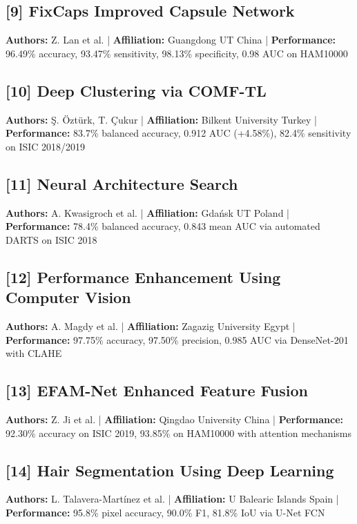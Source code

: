 \documentclass[10pt,twocolumn]{article}
\begin{document}
\subsection*{[9] FixCaps Improved Capsule Network}
\textbf{Authors:} Z. Lan et al. | \textbf{Affiliation:} Guangdong UT China | \textbf{Performance:} 96.49\% accuracy, 93.47\% sensitivity, 98.13\% specificity, 0.98 AUC on HAM10000

\subsection*{[10] Deep Clustering via COMF-TL}
\textbf{Authors:} Ş. Öztürk, T. Çukur | \textbf{Affiliation:} Bilkent University Turkey | \textbf{Performance:} 83.7\% balanced accuracy, 0.912 AUC (+4.58\%), 82.4\% sensitivity on ISIC 2018/2019

\subsection*{[11] Neural Architecture Search}
\textbf{Authors:} A. Kwasigroch et al. | \textbf{Affiliation:} Gdańsk UT Poland | \textbf{Performance:} 78.4\% balanced accuracy, 0.843 mean AUC via automated DARTS on ISIC 2018

\subsection*{[12] Performance Enhancement Using Computer Vision}
\textbf{Authors:} A. Magdy et al. | \textbf{Affiliation:} Zagazig University Egypt | \textbf{Performance:} 97.75\% accuracy, 97.50\% precision, 0.985 AUC via DenseNet-201 with CLAHE

\subsection*{[13] EFAM-Net Enhanced Feature Fusion}
\textbf{Authors:} Z. Ji et al. | \textbf{Affiliation:} Qingdao University China | \textbf{Performance:} 92.30\% accuracy on ISIC 2019, 93.85\% on HAM10000 with attention mechanisms

\subsection*{[14] Hair Segmentation Using Deep Learning}
\textbf{Authors:} L. Talavera-Martínez et al. | \textbf{Affiliation:} U Balearic Islands Spain | \textbf{Performance:} 95.8\% pixel accuracy, 90.0\% F1, 81.8\% IoU via U-Net FCN
\end{document}
